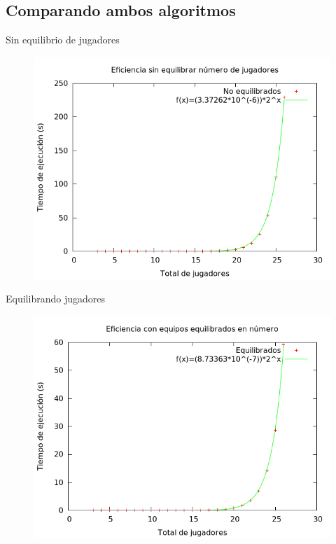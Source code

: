 \subsection{Comparando ambos algoritmos}
\begin{frame}
	\begin{exampleblock}{Sin equilibrio de jugadores}
	\begin{figure}[H]
    		\centering
   		\includegraphics[scale=0.4]{../Equipos/Graficas/sinEquilibrar.png}
    		\label{fig:Sin equilibrar}
	\end{figure}
	\end{exampleblock}
\end{frame}

\begin{frame}
	\begin{exampleblock}{Equilibrando jugadores}
	\begin{figure}[H]
    		\centering
	    \includegraphics[scale=0.4]{../Equipos/Graficas/equilibrar.png}
    		\label{fig:Equilibrado}
	\end{figure}
	\end{exampleblock}
\end{frame}

